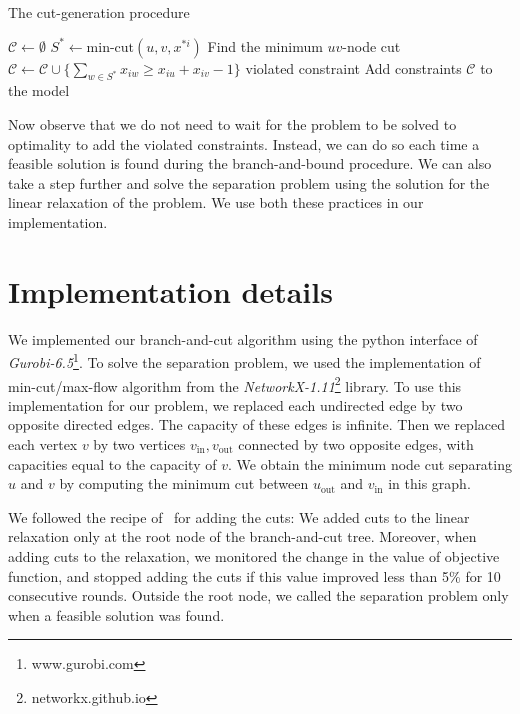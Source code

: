 \documentclass[]{article}
\begin{document}
\begin{algorithm}
\centering
\caption{The cut-generation procedure}
\label{alg:cut}
\begin{algorithmic}
\State $\mathcal{C} \gets \emptyset$
		\State $S^* \gets \text{min-cut}(u, v, x^{*i})$ \Comment Find the minimum $uv$-node cut
			\State $\mathcal{C} \gets \mathcal{C} \cup \{\sum_{w \in S^*} x_{iw} \geq x_{iu} + x_{iv} - 1\}$ \Comment violated constraint
		\EndIf
	\EndFor
\EndFor
\State Add constraints $\mathcal{C}$ to the model
\end{algorithmic}
\end{algorithm}

Now observe that we do not need to wait for the problem to be solved to
optimality to add the violated constraints. Instead, we can do so each
time a feasible solution is found during the branch-and-bound procedure.
We can also take a step further and solve the separation problem using
the solution for the linear relaxation of the problem. We use both these
practices in our implementation.

\section{Implementation details}
\label{sec:implementation}

We implemented our branch-and-cut algorithm using the python interface
of \emph{Gurobi-6.5}\footnote{www.gurobi.com}. To solve the separation problem, we used the
implementation of min-cut/max-flow algorithm from the \emph{NetworkX-1.11}\footnote{networkx.github.io} library. To use this implementation for our problem, we replaced
each undirected edge by two opposite directed edges. The capacity of
these edges is infinite. Then we replaced each vertex $v$ by two
vertices $v_{\text{in}}, v_{\text{out}}$ connected by two opposite
edges, with capacities equal to the capacity of $v$. We obtain the
minimum node cut separating $u$ and $v$ by computing the minimum cut
between $u_{\text{out}}$ and $v_{\text{in}}$ in this graph.

We followed the recipe of~\citet{CarvajalCGVW13} for adding the cuts: We added cuts to the
linear relaxation only at the root node of the branch-and-cut tree.
Moreover, when adding cuts to the relaxation, we monitored the change in
the value of objective function, and stopped adding the cuts if this
value improved less than 5\% for 10 consecutive rounds. Outside the root
node, we called the separation problem only when a feasible solution was
found.



\end{document}
